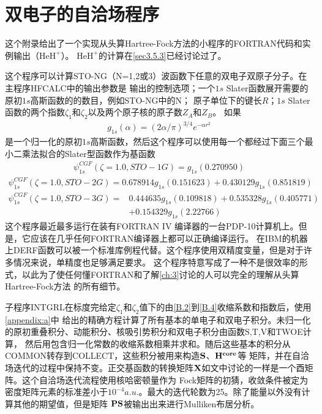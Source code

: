 \chapter{双电子的自洽场程序}

这个附录给出了一个实现从头算Hartree-Fock方法的小程序的FORTRAN代码和实例输出（$\mathrm{HeH}^+$）。
$\mathrm{HeH}^+$的计算在\autoref{sec3.5.3}已经讨论过了。

这个程序可以计算STO-NG（N=1,2或3）波函数下任意的双电子双原子分子。在主程序HFCALC中的输出参数是
输出的控制选项；一个$1s$ Slater函数展开需要的原初$1s$高斯函数的的数目，例如STO-NG中的N；
原子单位下的键长$R$；$1s$ Slater函数的两个指数$\zeta_1$和$\zeta_2$以及两个原子核的原子数$Z_A$和$Z_B$。
如果
\begin{align}
	\label{B.1}
	g_{1s}(\alpha)=(2\alpha/\pi)^{3/4}e^{-\alpha r^2}
\end{align}
是一个归一化的原初$1s$高斯函数，然后这个程序可以使用每一个都经过下面三个最小二乘法拟合的Slater型函数作为基函数
\begin{align}
	\label{B.2}
	\psi_{1s}^{CGF}(\zeta=1.0,STO-1G)=g_{1s}(0.270950)
\end{align}
\begin{align}
	\label{B.3}
	\psi_{1s}^{CGF}(\zeta=1.0,STO-2G)=0.678914g_{1s}(0.151623)+0.430129g_{1s}(0.851819)
\end{align}
\begin{align}
	\label{B.4}
	\psi_{1s}^{CGF}(\zeta=1.0,STO-3G)=&0.444635g_{1s}(0.109818)+0.535328g_{1s}(0.405771)
    \nonumber\\
                                      &+0.154329g_{1s}(2.22766)
\end{align}
这个程序最近最多运行在装有FORTRAN IV 编译器的一台PDP-10计算机上。但是，它应该在几乎任何FORTRAN编译器上都可以正确编译运行。
在IBM的机器上DERF函数可以被一个标准库例程代替。这个程序使用双精度变量，但是对于许多情况来说，单精度也足够满足要求。
这个程序特意写成了一种不是很效率的形式，以此为了使任何懂FORTRAN和了解\autoref{ch:3}讨论的人可以完全的理解从头算Hartree-Fock方法
的所有细节。

子程序INTGRL在标度完给定$\zeta_1$和$\zeta_2$值下的由\autoref{B.2}到\autoref{B.4}收缩系数和指数后，使用\autoref{appendix:a}中
给出的精确方程计算了所有基本的单电子和双电子积分。未归一化的原初重叠积分、动能积分、核吸引势积分和双电子积分由函数S,T,V和TWOE计算，
然后用包含归一化常数的收缩系数相乘并求和。随后这些基本的积分从COMMON转存到COLLECT，这些积分被用来构造$\bf{S}$、$\bf{H^{core}}$等
矩阵，并在自洽场迭代的过程中保持不变。正交基函数的转换矩阵$\bf{X}$如文中讨论的一样是一个酉矩阵。这个自洽场迭代流程使用核哈密顿量作为
Fock矩阵的初猜，收敛条件被定为密度矩阵元素的标准差小于$10^{-4}a.u.$。最大的迭代轮数为25。除了能量以外没有计算其他的期望值，但是矩阵
$\bf{PS}$被输出出来进行Mulliken布居分析。

